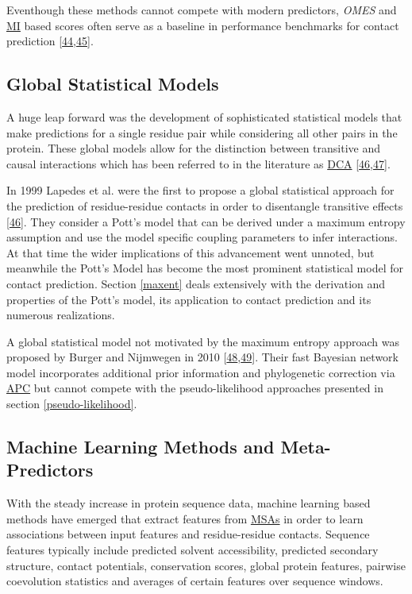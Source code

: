 \documentclass[12pt,a4paper,twoside]{book}
\theoremstyle{definition}
\theoremstyle{definition}
\theoremstyle{remark}
\begin{document}
Eventhough these methods cannot compete with modern predictors,
\emph{OMES} and \protect\hyperlink{abbrev}{MI} based scores often serve
as a baseline in performance benchmarks for contact prediction
{[}\protect\hyperlink{ref-DeJuan2013}{44},\protect\hyperlink{ref-Jones2012}{45}{]}.

\subsection{Global Statistical Models}\label{global-methods}

A huge leap forward was the development of sophisticated statistical
models that make predictions for a single residue pair while considering
all other pairs in the protein. These global models allow for the
distinction between transitive and causal interactions which has been
referred to in the literature as \protect\hyperlink{abbrev}{DCA}
{[}\protect\hyperlink{ref-Lapedes1999}{46},\protect\hyperlink{ref-Weigt2009}{47}{]}.

In 1999 Lapedes et al. were the first to propose a global statistical
approach for the prediction of residue-residue contacts in order to
disentangle transitive effects
{[}\protect\hyperlink{ref-Lapedes1999}{46}{]}. They consider a Pott's
model that can be derived under a maximum entropy assumption and use the
model specific coupling parameters to infer interactions. At that time
the wider implications of this advancement went unnoted, but meanwhile
the Pott's Model has become the most prominent statistical model for
contact prediction. Section \ref{maxent} deals extensively with the
derivation and properties of the Pott's model, its application to
contact prediction and its numerous realizations.

A global statistical model not motivated by the maximum entropy approach
was proposed by Burger and Nijmwegen in 2010
{[}\protect\hyperlink{ref-Burger2008}{48},\protect\hyperlink{ref-Burger2010}{49}{]}.
Their fast Bayesian network model incorporates additional prior
information and phylogenetic correction via
\protect\hyperlink{abbrev}{APC} but cannot compete with the
pseudo-likelihood approaches presented in section
\ref{pseudo-likelihood}.

\subsection{Machine Learning Methods and
Meta-Predictors}\label{meta-predictors}

With the steady increase in protein sequence data, machine learning
based methods have emerged that extract features from
\protect\hyperlink{abbrev}{MSAs} in order to learn associations between
input features and residue-residue contacts. Sequence features typically
include predicted solvent accessibility, predicted secondary structure,
contact potentials, conservation scores, global protein features,
pairwise coevolution statistics and averages of certain features over
sequence windows.
\end{document}
